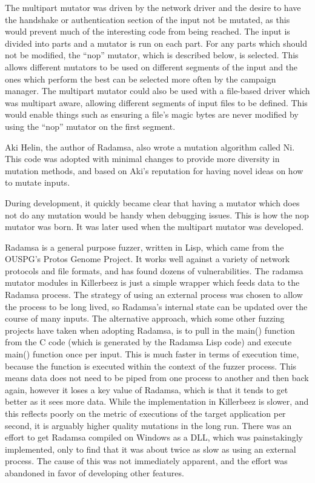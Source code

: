 The multipart mutator was driven by the network driver and the desire to have
the handshake or authentication section of the input not be mutated, as this
would prevent much of the interesting code from being reached.  The input is
divided into parts and a mutator is run on each part. For any parts which
should not be modified, the ``nop'' mutator, which is described below, is
selected. This allows different mutators to be used on different segments of
the input and the ones which perform the best can be selected more often by the
campaign manager.  The multipart mutator could also be used with a file-based
driver which was multipart aware, allowing different segments of input files to
be defined.  This would enable things such as ensuring a file's magic bytes are
never modified by using the ``nop'' mutator on the first segment.

Aki Helin, the author of Radamsa, also wrote a mutation algorithm called Ni.
This code was adopted with minimal changes to provide more diversity in
mutation methods, and based on Aki's reputation for having novel ideas on how
to mutate inputs.

During development, it quickly became clear that having a mutator which does
not do any mutation would be handy when debugging issues.  This is how the nop
mutator was born. It was later used when the multipart mutator was developed.

Radamsa is a general purpose fuzzer, written in Lisp, which came from the
OUSPG's Protos Genome Project. It works well against a variety of network
protocols and file formats, and has found dozens of vulnerabilities.  The
radamsa mutator modules in Killerbeez is just a simple wrapper which feeds data
to the Radamsa process.  The strategy of using an external process was chosen
to allow the process to be long lived, so Radamsa's internal state can be
updated over the course of many inputs.  The alternative approach, which some
other fuzzing projects have taken when adopting Radamsa, is to pull in the main()
function from the C code (which is generated by the Radamsa Lisp code) and
execute main() function once per input.  This is much faster
in terms of execution time, because the function is executed within the context of the
fuzzer process.  This means data does not need to be piped from one process
to another and then back again, however it loses a key value of Radamsa, which
is that it tends to get better as it sees more data. While the implementation
in Killerbeez is slower, and this reflects poorly on the metric of executions
of the target application per second, it is arguably higher quality mutations
in the long run.  There was an effort to get Radamsa compiled on Windows as a
DLL, which was painstakingly implemented, only to find that it was about twice
as slow as using an external process. The cause of this was not immediately
apparent, and the effort was abandoned in favor of developing other features.

